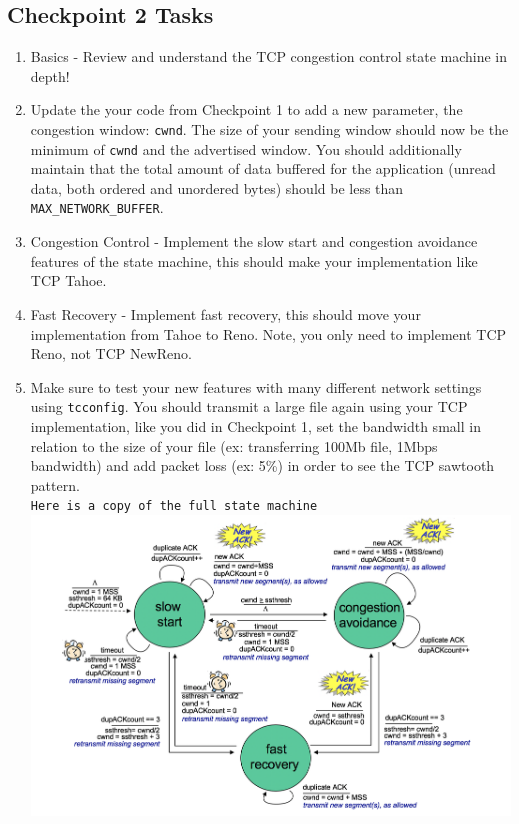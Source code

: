 \subsection{Checkpoint 2 Tasks}
\begin{enumerate}
    \item Basics - Review and understand the TCP congestion control state machine in depth! \cite{state_machine}
    
    \item 
    Update the your code from Checkpoint 1 to add a new parameter, the congestion window: \texttt{cwnd}. The size of your sending window should now be the minimum of \texttt{cwnd} and the advertised window. You should additionally maintain that the total amount of data buffered for the application (unread data, both ordered and unordered bytes) should be less than \texttt{MAX\_NETWORK\_BUFFER}. 
    
    \item Congestion Control - Implement the slow start and congestion avoidance features of the state machine, this should make your implementation like TCP Tahoe. 
    
    \item Fast Recovery - Implement fast recovery, this should move your implementation from Tahoe to Reno. Note, you only need to implement TCP Reno, not TCP NewReno.
    
    \item Make sure to test your new features with many different network settings using \texttt{tcconfig}. You should transmit a large file again using your TCP implementation, like you did in Checkpoint 1, set the bandwidth small in relation to the size of your file (ex: transferring 100Mb file, 1Mbps bandwidth) and add packet loss (ex: 5\%) in order to see the TCP sawtooth pattern.
\\

\texttt{Here is a copy of the full state machine}\\
\includegraphics[scale=0.3]{image.png}

\end{enumerate}


